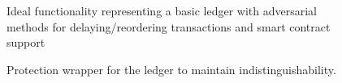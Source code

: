 \begin{figure}[h]
	
	\label{fig:algorithm:exetx}
\end{figure}

\begin{figure}[h]
    
    \label{fig:algorithm:execcreate}
\end{figure}

\begin{figure}[h]
    
	\caption{Ideal functionality representing a basic ledger with adversarial methods for delaying/reordering transactions and smart contract support}
	\label{fig:functionality:ledger}
\end{figure}

\begin{figure}[h]
	
	\caption{Protection wrapper for the ledger to maintain indistinguishability.}
	\label{fig:wrapper:protected}
\end{figure}

